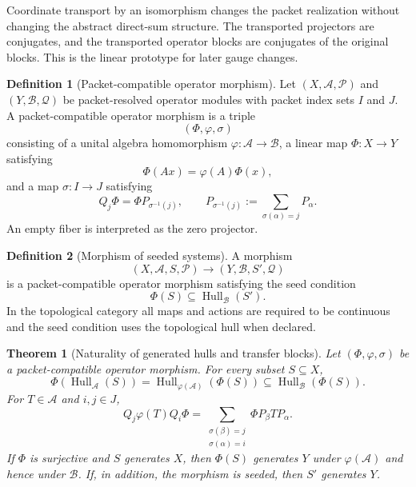 \documentclass[11pt]{article}
\newtheorem{theorem}{Theorem}[section]
\theoremstyle{definition}
\newtheorem{definition}[definition]{Definition}
\theoremstyle{remark}
\theoremstyle{definition}\newtheorem{example}[theorem]{Example}
\newcommand{\A}{\mathcal A}
\newcommand{\B}{\mathcal B}
\newcommand{\Pcal}{\mathcal P}
\newcommand{\Qcal}{\mathcal Q}
\newcommand{\Hull}{\operatorname{Hull}}
\newcommand{\RecordID}[1]{\label{record:#1}}
\newcommand{\Depends}[1]{}
\newcommand{\Exports}[1]{}
\begin{document}
\begin{interpretation}
Coordinate transport by an isomorphism changes the packet realization without changing the abstract direct-sum structure.  The transported projectors are conjugates, and the transported operator blocks are conjugates of the original blocks.  This is the linear prototype for later gauge changes.
\end{interpretation}


\begin{definition}[Packet-compatible operator morphism]
\label{def:packet-morphism}
Let $(X,\A,\Pcal)$ and $(Y,\B,\Qcal)$ be packet-resolved operator modules with packet index sets $I$ and $J$.  A packet-compatible operator morphism is a triple
\[
(\Phi,\varphi,\sigma)
\]
consisting of a unital algebra homomorphism $\varphi:\A\to\B$, a linear map $\Phi:X\to Y$ satisfying
\[
\Phi(Ax)=\varphi(A)\Phi(x),
\]
and a map $\sigma:I\to J$ satisfying
\[
Q_j\Phi
=
\Phi P_{\sigma^{-1}(j)},
\qquad
P_{\sigma^{-1}(j)}:=
\sum_{\sigma(\alpha)=j}P_\alpha.
\]
An empty fiber is interpreted as the zero projector.
\end{definition}
\RecordID{PSC-I-D-PACKET-MORPHISM}

\begin{definition}[Morphism of seeded systems]
\label{def:seed-morphism}
A morphism
\[
(X,\A,S,\Pcal)\longrightarrow(Y,\B,S',\Qcal)
\]
is a packet-compatible operator morphism satisfying the seed condition
\[
\Phi(S)\subseteq\Hull_\B(S').
\]
In the topological category all maps and actions are required to be continuous and the seed condition uses the topological hull when declared.
\end{definition}
\RecordID{PSC-I-D-SEED-MORPHISM}

\begin{theorem}[Naturality of generated hulls and transfer blocks]
\label{thm:naturality}
Let $(\Phi,\varphi,\sigma)$ be a packet-compatible operator morphism.  For every subset $S\subseteq X$,
\[
\boxed{
\Phi(\Hull_\A(S))
=
\Hull_{\varphi(\A)}(\Phi(S))
\subseteq
\Hull_\B(\Phi(S)).
}
\]
For $T\in\A$ and $i,j\in J$,
\[
\boxed{
Q_j\varphi(T)Q_i\Phi
=
\sum_{\substack{\sigma(\beta)=j\\\sigma(\alpha)=i}}
\Phi P_\beta TP_\alpha.
}
\]
If $\Phi$ is surjective and $S$ generates $X$, then $\Phi(S)$ generates $Y$ under $\varphi(\A)$ and hence under $\B$.  If, in addition, the morphism is seeded, then $S'$ generates $Y$.
\end{theorem}
\RecordID{PSC-I-T-NATURALITY}
\Depends{PSC-I-D-PACKET-MORPHISM and PSC-I-T-BLOCK-MULTIPLICATION.}
\Exports{The canonical naturality theorem for every later realization.}
\end{document}
